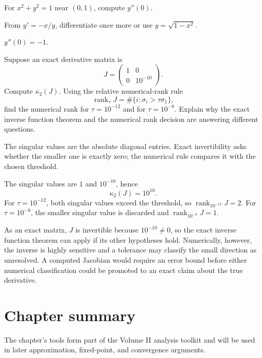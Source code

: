 \begin{exercise}\label{exr:ii09-expand-16}
For \(x^2+y^2=1\) near \((0,1)\), compute \(y''(0)\).
\end{exercise}
\begin{hint}
From \(y'=-x/y\), differentiate once more or use \(y=\sqrt{1-x^2}\).
\end{hint}
\begin{solution}
\(y''(0)=-1\).
\end{solution}
\begin{exercise}\label{exr:ii09-numerical-conditioning-01}
Suppose an exact derivative matrix is
\[
J=
\begin{pmatrix}
1&0\\
0&10^{-10}
\end{pmatrix}.
\]
Compute \(\kappa_2(J)\).  Using the relative numerical-rank rule
\[
\operatorname{rank}_{\tau}J
=
\#\{i:\sigma_i>\tau\sigma_1\},
\]
find the numerical rank for \(\tau=10^{-12}\) and for \(\tau=10^{-8}\).
Explain why the exact inverse function theorem and the numerical rank decision
are answering different questions.
\end{exercise}
\begin{hint}
The singular values are the absolute diagonal entries.  Exact invertibility
asks whether the smaller one is exactly zero; the numerical rule compares it
with the chosen threshold.
\end{hint}
\begin{solution}
The singular values are \(1\) and \(10^{-10}\), hence
\[
\kappa_2(J)=10^{10}.
\]
For \(\tau=10^{-12}\), both singular values exceed the threshold, so
\(\operatorname{rank}_{10^{-12}}J=2\).  For \(\tau=10^{-8}\), the smaller
singular value is discarded and
\(\operatorname{rank}_{10^{-8}}J=1\).

As an exact matrix, \(J\) is invertible because \(10^{-10}\ne0\), so the exact
inverse function theorem can apply if its other hypotheses hold.  Numerically,
however, the inverse is highly sensitive and a tolerance may classify the
small direction as unresolved.  A computed Jacobian would require an error
bound before either numerical classification could be promoted to an exact
claim about the true derivative.
\end{solution}
\section*{Chapter summary}
The chapter's tools form part of the Volume II analysis toolkit and will be used in later approximation, fixed-point, and convergence arguments.
